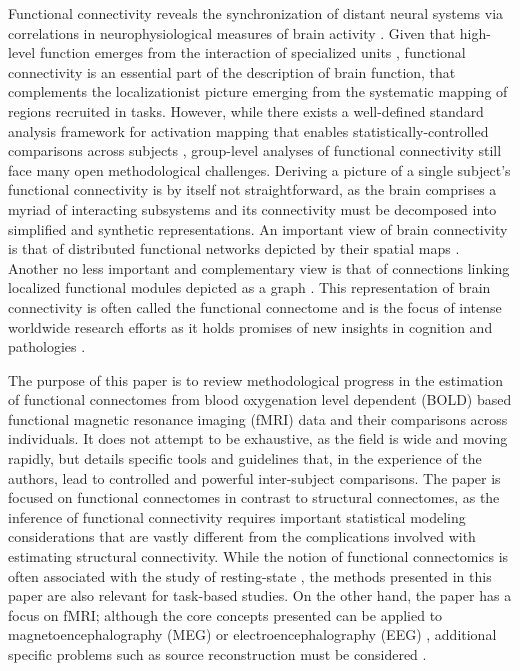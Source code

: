 \documentclass[5p]{elsarticle}
\begin{document}
Functional connectivity reveals the synchronization of distant neural systems
via correlations in neurophysiological measures of brain activity 
\cite{friston1993, biswal1995}.  Given that
high-level function emerges from the interaction of specialized units
\cite{tononi1992},
functional connectivity is an essential part of the description of brain
function, that complements the localizationist picture emerging from the
systematic mapping of regions recruited in tasks\cite{sporns2004}. However,
while there exists a well-defined standard analysis framework for activation
mapping that enables statistically-controlled comparisons across subjects
\cite{friston1995}, group-level analyses of functional connectivity still face
many open methodological challenges. Deriving a picture of a single subject's
functional connectivity is by itself not straightforward, as the brain comprises
a myriad of interacting subsystems and its connectivity must be decomposed into
simplified and synthetic representations. An important view of brain
connectivity is that of distributed functional networks depicted by their
spatial maps \cite{fox2005}. Another no less important and complementary view is
that of connections linking localized functional modules depicted as a graph
\cite{bullmore2009}. This representation of brain connectivity is often called
the functional connectome \cite{sporns2005} and is the focus of intense
worldwide research efforts as it holds promises of new insights in cognition and
pathologies \cite{greicius2008b,biswal2010,fox2010}.

The purpose of this paper is to review methodological progress in the
estimation of functional connectomes from blood oxygenation level dependent
(BOLD) based functional magnetic resonance imaging (fMRI) data and their
comparisons across individuals.  It does not attempt
to be exhaustive, as the field is wide and moving rapidly, but details
specific tools and guidelines that, in the experience of the authors,
lead to controlled and powerful inter-subject comparisons. The paper is
focused on functional connectomes in contrast to structural connectomes,
as the inference of functional connectivity requires important statistical
modeling considerations that are vastly different from the complications involved
with estimating structural connectivity.
While the notion of functional
connectomics is often associated with the study of resting-state
\cite{biswal2010}, the methods presented in this paper are also relevant
for task-based studies. On the other hand, the paper has a focus on fMRI;
although the core concepts presented can be applied to 
magnetoencephalography (MEG) or electroencephalography (EEG)
\cite{stam2004}, additional specific problems such as source
reconstruction must be considered \cite{schoffelen2009}.
\end{document}
